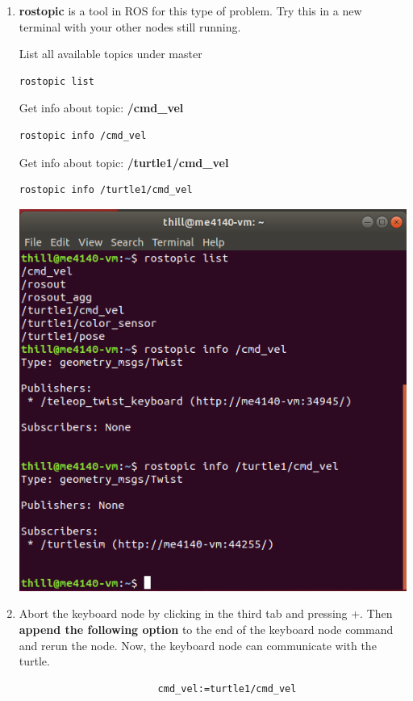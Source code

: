 \documentclass[12pt]{article}
\begin{document}
\begin{description}
\begin{enumerate}
\newpage
\item {\bf rostopic} is a tool in ROS for this type of problem. Try this in a new terminal with your other nodes still running.



\begin{multicols}{2}

List all available topics under master
\begin{verbatim}
rostopic list
\end{verbatim}
Get info about topic: {\bf /cmd\_vel}
\begin{verbatim}
rostopic info /cmd_vel
\end{verbatim}
Get info about topic: {\bf /turtle1/cmd\_vel}
\begin{verbatim}
rostopic info /turtle1/cmd_vel
\end{verbatim}

\vspace{10mm} 

\includegraphics[scale=0.4]{tutorial3_fig4.png} \vspace{3mm}\\

\end{multicols}	
\vspace{5mm}
\item Abort the keyboard node by clicking in the third tab and pressing \CTRLKey +\CKey. Then {\bf append the following option} to the end of the keyboard node command and rerun the node. Now, the keyboard node can communicate with the turtle. 
\begin{verbatim}
                        cmd_vel:=turtle1/cmd_vel
\end{verbatim}


\end{enumerate}
\end{description}
\end{document}
